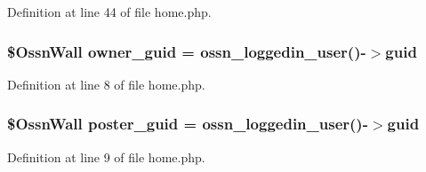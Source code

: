 Definition at line 44 of file home.\+php.

\subsubsection[{\texorpdfstring{owner\+\_\+guid}{owner_guid}}]{\setlength{\rightskip}{0pt plus 5cm}\${\bf Ossn\+Wall} owner\+\_\+guid = {\bf ossn\+\_\+loggedin\+\_\+user}()-\/$>$guid}\hypertarget{components_2_ossn_wall_2actions_2wall_2post_2home_8php_a307051fefc937afd02c509c55646f50b}{}\label{components_2_ossn_wall_2actions_2wall_2post_2home_8php_a307051fefc937afd02c509c55646f50b}


Definition at line 8 of file home.\+php.

\subsubsection[{\texorpdfstring{poster\+\_\+guid}{poster_guid}}]{\setlength{\rightskip}{0pt plus 5cm}\${\bf Ossn\+Wall} poster\+\_\+guid = {\bf ossn\+\_\+loggedin\+\_\+user}()-\/$>$guid}\hypertarget{components_2_ossn_wall_2actions_2wall_2post_2home_8php_a24eb7b66e353d8983f6f2af979250671}{}\label{components_2_ossn_wall_2actions_2wall_2post_2home_8php_a24eb7b66e353d8983f6f2af979250671}


Definition at line 9 of file home.\+php.

